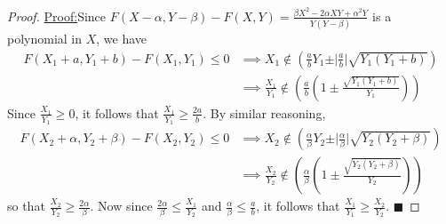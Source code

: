 \documentclass{article}
\theoremstyle{case}
\newenvironment{claim}[1]{\par\noindent\underline{Claim:}\space#1}{}
\newenvironment{claimproof}[1]{\par\noindent\underline{Proof:}\space#1}{\hfill $\blacksquare$}
\begin{document}
\begin{proof}
\begin{claimproof}
Since $F(X - \alpha, Y - \beta) - F(X, Y) = \frac{\beta X^2 - 2\alpha XY + \alpha^2 Y}{Y\left( Y-\beta\right)}$ is a polynomial in $X$, we have
\begin{align*}
F(X_1+a, Y_1+b) - F(X_1,Y_1) \leq 0 & \implies X_1 \not \in \left( \frac{a}{b}Y_1 \pm \vert \frac{a}{b} \vert \sqrt{Y_1\left( Y_1+b\right) } \right) \\
& \implies \frac{X_1}{Y_1} \not \in \left( \frac{a}{b} \left( 1 \pm \frac{\sqrt{Y_1\left( Y_1+b\right) }}{Y_1}\right) \right)
\end{align*}
Since $\frac{X_1}{Y_1} \geq 0$, it follows that $\frac{X_1}{Y_1} \geq \frac{2a}{b}$. By similar reasoning, 
\begin{align*}
F(X_2+\alpha, Y_2+\beta) - F(X_2,Y_2) \leq 0 & \implies X_2 \not \in \left( \frac{\alpha}{\beta}Y_2 \pm \vert \frac{\alpha}{\beta} \vert \sqrt{Y_2\left( Y_2+\beta \right) } \right) \\
& \implies \frac{X_2}{Y_2} \not \in \left( \frac{\alpha}{\beta} \left( 1 \pm \frac{\sqrt{Y_2\left( Y_2+\beta \right) }}{Y_2}\right) \right)
\end{align*}
so that $\frac{X_2}{Y_2} \geq \frac{2\alpha}{\beta}$. Now since $\frac{2\alpha}{\beta} \leq \frac{X_1}{Y_2}$ and $\frac{\alpha}{\beta} \leq \frac{a}{b}$, it follows that $\frac{X_1}{Y_1} \geq \frac{X_2}{Y_2}$.
\end{claimproof}


\end{proof}
\end{document}
